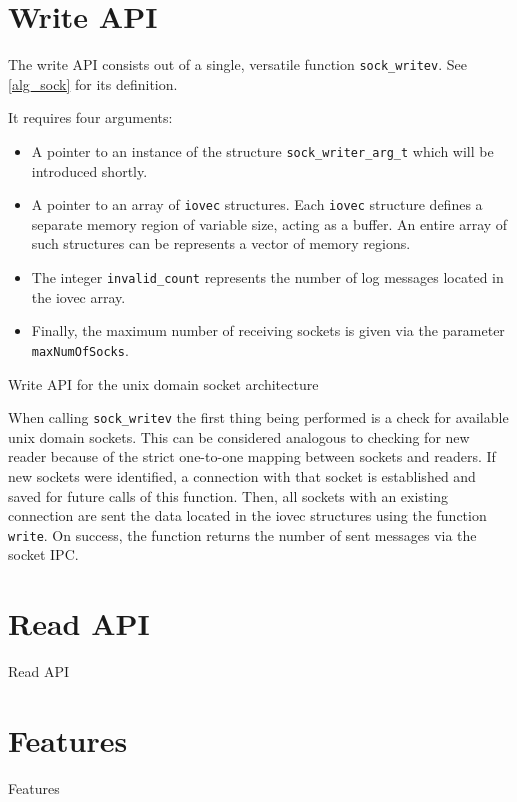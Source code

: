 \section{Write API}
The write API consists out of a single, versatile function \texttt{sock\_writev}.
See \ref{alg_sock} for its definition.

It requires four arguments:
\begin{itemize}
    \item A pointer to an instance of the structure \texttt{sock\_writer\_arg\_t} which will be introduced shortly.
    \item A pointer to an array of \texttt{iovec} structures.
            Each \texttt{iovec} structure defines a separate memory region of variable size, acting as a buffer.
            An entire array of such structures can be represents a vector of memory regions\cite{man:iovec}.
    \item The integer \texttt{invalid\_count} represents the number of log messages located in the iovec array.
    \item Finally, the maximum number of receiving sockets is given via the parameter \texttt{maxNumOfSocks}.
\end{itemize}

\begin{algorithm}[h!]
    
    \caption[Socket: Write API]{Write API for the unix domain socket architecture}
    \label{alg:sock}
\end{algorithm}

When calling \texttt{sock\_writev} the first thing being performed is a check for available unix domain sockets.
This can be considered analogous to checking for new reader because of the strict one-to-one mapping between sockets and readers.
If new sockets were identified, a connection with that socket is established and saved for future calls of this function.
Then, all sockets with an existing connection are sent the data located in the iovec structures using the function \texttt{write}.
On success, the function returns the number of sent messages via the socket IPC.


\section{Read API}
Read API

\section{Features}
Features